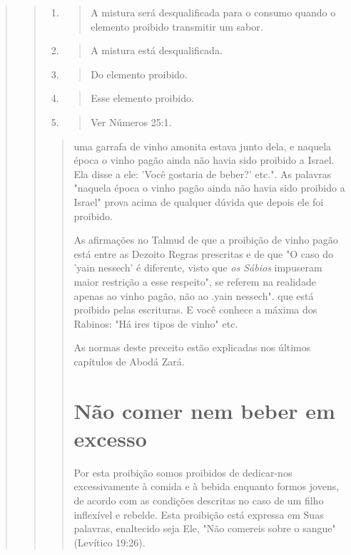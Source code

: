 \begin{quote}
\begin{quote}
\begin{enumerate}
\def\labelenumi{\arabic{enumi}.}
\setcounter{enumi}{360}
\item
 \begin{quote}
 A mistura será desqualificada para o consumo quando o elemento
 proibido transmitir um sabor.
 \end{quote}
\item
 \begin{quote}
 A mistura está desqualificada.
 \end{quote}
\item
 \begin{quote}
 Do elemento proibido.
 \end{quote}
\item
 \begin{quote}
 Esse elemento proibido.
 \end{quote}
\item
 \begin{quote}
 Ver Números 25:1.
 \end{quote}
\end{enumerate}

\begin{quote}uma garrafa de vinho amonita estava junto dela, e naquela época o vinho
pagão ainda não havia sido proibido a Israel. Ela disse a ele: 'Você
gostaria de beber?' etc.". As palavras "naquela época o vinho pagão
ainda não havia sido proibido a Israel" prova acima de qualquer dúvida
que depois ele foi proibido.

As afirmações no Talmud de que a proibição de vinho pagão está entre as
Dezoito Regras prescritas e de que "O caso do 'yain nessech' é
diferen­te, visto que \emph{os Sábios} impuseram maior restrição a esse
respeito", se referem na realidade apenas ao vinho pagão, não ao
.yain nessech". que está proibido pelas escrituras. E
você conhece a máxima dos Rabinos: "Há ires tipos de vi­nho" etc.

As normas deste preceito estão explicadas nos últimos capítulos de Abodá
Zará.

\section{Não comer nem beber em excesso}

Por esta proibição somos proibidos de dedicar-nos excessivamente à
comida e à bebida enquanto formos jovens, de acordo com as condições
des­critas no caso de um filho inflexível e rebelde. Esta proibição está
expressa em Suas palavras, enaltecido seja Ele, "Não comereis sobre o
sangue" (Levítico 19:26).


\end{quote}
\end{quote}
\end{quote}
